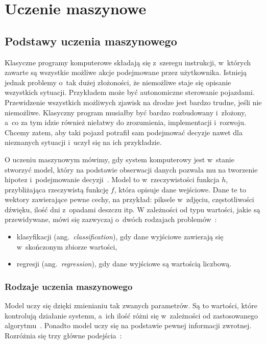 \chapter{Uczenie maszynowe}\label{ch:uczenie-maszynowe}

\section{Podstawy uczenia maszynowego}\label{sec:podstawy-uczenia-maszynowego}

Klasyczne programy komputerowe składają się z~szeregu instrukcji, w~których zawarte są wszystkie możliwe akcje podejmowane przez użytkownika.
Istnieją jednak problemy o~tak dużej złożoności, że niemożliwe staje się opisanie wszystkich sytuacji.
Przykładem może być autonomiczne sterowanie pojazdami.
Przewidzenie wszystkich możliwych zjawisk na drodze jest bardzo trudne, jeśli nie niemożliwe.
Klasyczny program musiałby być bardzo rozbudowany i~złożony, a~co za tym idzie również niełatwy do zrozumienia, implementacji i~rozwoju.
Chcemy zatem, aby taki pojazd potrafił sam podejmować decyzje nawet dla nieznanych sytuacji i~uczył się na ich przykładzie.

O uczeniu maszynowym mówimy, gdy system komputerowy jest w~stanie stworzyć model, który na podstawie obserwacji danych pozwala mu na tworzenie hipotez i~podejmowanie decyzji~\cite{Russell2020}.
Model to w~rzeczywistości funkcja \(h\), przybliżająca rzeczywistą funkcję \(f\), która opisuje dane wejściowe.
Dane te to wektory zawierające pewne cechy, na przykład: piksele w~zdjęciu, częstotliwości dźwięku, ilość dni z~opadami deszczu itp.
W zależności od typu wartości, jakie są przewidywane, mówi się zazwyczaj o~dwóch rodzajach problemów~\cite{Russell2020}:

\begin{itemize}
    \item klasyfikacji (ang.~\textit{classification}), gdy dane wyjściowe zawierają się w~skończonym zbiorze wartości,
    \item regresji (ang.~\textit{regression}), gdy dane wyjściowe są wartością liczbową.
\end{itemize}

\subsection{Rodzaje uczenia maszynowego}\label{subsec:rodzaje-uczenia-maszynowego}

Model uczy się dzięki zmienianiu tak zwanych parametrów.
Są to wartości, które kontrolują działanie systemu, a~ich ilość różni się w~zależności od zastosowanego algorytmu~\cite{Goodfellow2016}.
Ponadto model uczy się na podstawie pewnej informacji zwrotnej.
Rozróżnia się trzy główne podejścia~\cite{Russell2020}:

